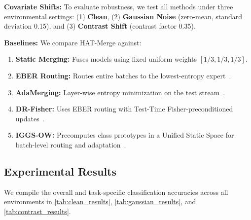 \documentclass{article}
\theoremstyle{plain}
\theoremstyle{definition}
\theoremstyle{remark}
\begin{document}
\textbf{Covariate Shifts:} To evaluate robustness, we test all methods under three environmental settings: (1) \textbf{Clean}, (2) \textbf{Gaussian Noise} (zero-mean, standard deviation 0.15), and (3) \textbf{Contrast Shift} (contrast factor 0.35).

\textbf{Baselines:} We compare HAT-Merge against:
\begin{enumerate}
    \item \textbf{Static Merging:} Fuses models using fixed uniform weights $[1/3, 1/3, 1/3]$.
    \item \textbf{EBER Routing:} Routes entire batches to the lowest-entropy expert~\cite{eber}.
    \item \textbf{AdaMerging:} Layer-wise entropy minimization on the test stream~\cite{adamerging}.
    \item \textbf{DR-Fisher:} Uses EBER routing with Test-Time Fisher-preconditioned updates~\cite{dr_fisher}.
    \item \textbf{IGGS-OW:} Precomputes class prototypes in a Unified Static Space for batch-level routing and adaptation~\cite{iggs_ow}.
\end{enumerate}

\subsection{Experimental Results}
We compile the overall and task-specific classification accuracies across all environments in \cref{tab:clean_results}, \cref{tab:gaussian_results}, and \cref{tab:contrast_results}.
\end{document}
